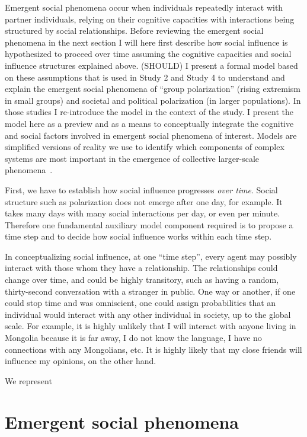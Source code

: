 \documentclass[12pt,letterpaper]{article}
\begin{document}
Emergent social phenomena occur when individuals repeatedly interact with
partner individuals, relying on their cognitive capacities
with interactions being structured by social relationships. Before
reviewing the emergent social phenomena in the next section I 
will here first describe how social influence is hypothesized to proceed over
time assuming the cognitive capacities and social influence structures 
explained above. (SHOULD) I present a formal model based on these assumptions
that is used in Study 2 and Study 4 to understand and explain the emergent 
social phenomena of ``group polarization'' (rising extremism in small groups) 
and societal and political polarization (in larger populations). In those studies
I re-introduce the model in the context of the study. I present the model
here as a preview and as a means to conceptually integrate the cognitive and
social factors involved in emergent social phenomena of interest. Models are
simplified versions of reality we use to identify which components of
complex systems are most important in the emergence of collective larger-scale
phenomena~\cite{Wimsatt1972,Wimsatt1997,Machamer2000,Wimsatt2007,Smaldino2017}.

First, we have to establish how social influence progresses \emph{over time}.
Social structure such as polarization does not emerge after one day, for example.
It takes many days with many social interactions per day, or even per minute.
Therefore one fundamental auxiliary model component required is to propose
a time step and to decide how social influence works within each time step.


In conceptualizing social influence, at one ``time step'', every agent may
possibly interact with those whom they have a relationship. The relationships
could change over time, and could be highly transitory, such as having a 
random, thirty-second conversation with a stranger in public. One way or
another, if one could stop time and was omniscient, one could assign 
probabilities that an individual would interact with any other individual
in society, up to the global scale. For example, it is highly unlikely that
I will interact with anyone living in Mongolia because it is far away, I do not
know the language, I have no connections with any Mongolians, etc. It is
highly likely that my close friends will influence my opinions, on the other
hand.

We represent 


\section{Emergent social phenomena}
\end{document}
